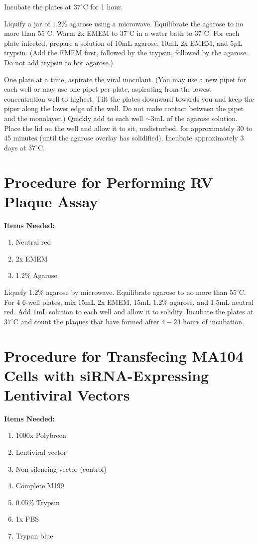 Incubate the plates at $37^{\circ}$C for 1 hour.

Liquify a jar of $1.2\%$ agarose using a microwave. Equilibrate the agarose to no more than $55^{\circ}$C. Warm 2x EMEM to $37^{\circ}$C in a water bath to $37^{\circ}$C. For each plate infected, prepare a solution of $10$mL agarose, $10$mL 2x EMEM, and $5\mu$L trypsin. (Add the EMEM first, followed by the trypsin, followed by the agarose. Do not add trypsin to hot agarose.)

One plate at a time, aspirate the viral inoculant. (You may use a new pipet for each well or may use one pipet per plate, aspirating from the lowest concentration well to highest. Tilt the plates downward towards you and keep the piper along the lower edge of the well. Do not make contact between the pipet and the monolayer.) Quickly add to each well $\sim 3$mL of the agarose solution. Place the lid on the well and allow it to sit, undisturbed, for approximately 30 to 45 minutes (until the agarose overlay has solidified). Incubate approximately 3 days at $37^{\circ}$C.

\section{Procedure for Performing RV Plaque Assay}

{\bfseries Items Needed:} \begin{enumerate}
	\item Neutral red
	\item 2x EMEM
	\item 1.2\% Agarose
\end{enumerate}

Liquefy 1.2\% agarose by microwave. Equilibrate agarose to no more than $55^{\circ}$C. For 4 6-well plates, mix $15$mL 2x EMEM, $15$mL 1.2\% agarose, and 1.5mL neutral red. Add $1$mL solution to each well and allow it to solidify. Incubate the plates at $37^{\circ}$C and count the plaques that have formed after $4-24$ hours of incubation.

\section{Procedure for Transfecing MA104 Cells with siRNA-Expressing Lentiviral Vectors}

{\bfseries Items Needed:} \begin{enumerate}
	\item 1000x Polybreen
	\item Lentiviral vector
	\item Non-silencing vector (control)
	\item Complete M199
	\item 0.05\% Trypsin
	\item 1x PBS
	\item Trypan blue
\end{enumerate}

